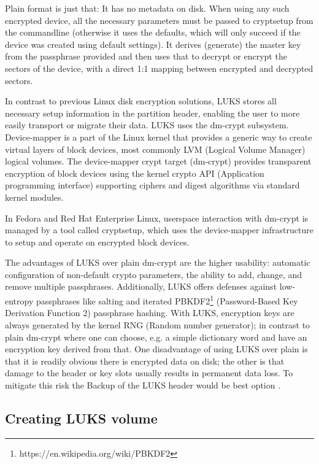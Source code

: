 Plain format is just that: It has no metadata on disk.
When using any such encrypted device, all the necessary parameters must be passed to cryptsetup from the commandline (otherwise it uses the defaults, which will only succeed if the device was created using default settings).
It derives (generate) the master key from the passphrase provided and then uses that to decrypt or encrypt the sectors of the device, with a direct 1:1 mapping between encrypted and decrypted sectors.

In contrast to previous Linux disk encryption solutions, LUKS stores all necessary setup information in the partition header, enabling the user to more easily transport or migrate their data.
LUKS uses the dm-crypt subsystem.
Device-mapper is a part of the Linux kernel that provides a generic way to create virtual layers of block devices, most commonly LVM (Logical Volume Manager) logical volumes.
The device-mapper crypt target (dm-crypt) provides transparent encryption of block devices using the kernel crypto API (Application programming interface) supporting ciphers and digest algorithms via standard kernel modules.

In Fedora and Red Hat Enterprise Linux, userspace interaction with dm-crypt is managed by a tool called cryptsetup, which uses the device-mapper infrastructure to setup and operate on encrypted block devices.

The advantages of LUKS over plain dm-crypt are the higher usability: automatic configuration of non-default crypto parameters, the ability to add, change, and remove multiple passphrases.
Additionally, LUKS offers defenses against low-entropy passphrases like salting and iterated PBKDF2\footnote{https://en.wikipedia.org/wiki/PBKDF2} (Password-Based Key Derivation Function 2) passphrase hashing.
With LUKS, encryption keys are always generated by the kernel RNG (Random number generator); in contrast to plain dm-crypt where one can choose, e.g. a simple dictionary word and have an encryption key derived from that.
One disadvantage of using LUKS over plain is that it is readily obvious there is encrypted data on disk; the other is that damage to the header or key slots usually results in permanent data loss.
To mitigate this risk the Backup of the LUKS header would be best option \cite{fruhwirth2005luks}.



\subsection{Creating LUKS volume}\label{createLUKS}


